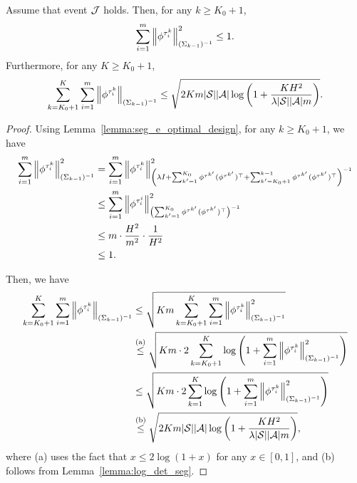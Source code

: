 \begin{lemma}\label{lemma:ellip_potent_with_opt_init_seg}
	Assume that event $\mathcal{J}$ holds. 
	Then, for any $k \geq K_0+1$,
	\begin{align*}
		\sum_{i=1}^{m} \left\|  \phi^{\tau^k_i} \right\|_{(\Sigma_{k-1})^{-1}}^2 \leq 1 .
	\end{align*}
	Furthermore, for any $K\geq K_0+1$,
	\begin{align*}
		\sum_{k=K_0+1}^{K} \sum_{i=1}^{m} \left\|  \phi^{\tau^k_i} \right\|_{(\Sigma_{k-1})^{-1}} \leq \sqrt{2Km |\mathcal{S}| |\mathcal{A}| \log \left(  1+ \frac{  KH^2 }{ \lambda |\mathcal{S}| |\mathcal{A}|m }  \right)} .
	\end{align*}
\end{lemma}
\begin{proof}
	Using Lemma~\ref{lemma:seg_e_optimal_design}, for any $k\geq K_0+1$, we have
	\begin{align*}
		\sum_{i=1}^{m} \left\|  \phi^{\tau^k_i} \right\|_{(\Sigma_{k-1})^{-1}}^2 &= \sum_{i=1}^{m} \left\|  \phi^{\tau^k_i} \right\|_{\left( \lambda I + \sum_{k'=1}^{K_0} \phi^{\tau^{k'}} (\phi^{\tau^{k'}})^\top + \sum_{k'=K_0+1}^{k-1} \phi^{\tau^{k'}} (\phi^{\tau^{k'}})^\top  \right)^{-1}}^2
		\\
		&\leq \sum_{i=1}^{m} \left\|  \phi^{\tau^i_i}  \right\|_{\left(  \sum_{k'=1}^{K_0} \phi^{\tau^{k'}} (\phi^{\tau^{k'}})^\top  \right)^{-1}}^2
		\\
		&\leq m \cdot \frac{H^2}{m^2} \cdot \frac{1}{H^2}
		\\
		&\leq 1 .
	\end{align*}
	
	Then, we have
	\begin{align*}
		\sum_{k=K_0+1}^{K} \sum_{i=1}^{m} \left\|  \phi^{\tau^k_i} \right\|_{(\Sigma_{k-1})^{-1}} &\leq \sqrt{ K m \sum_{k=K_0+1}^{K} \sum_{i=1}^{m} \left\|  \phi^{\tau^k_i} \right\|_{(\Sigma_{k-1})^{-1}}^2 }
		\\
		&\overset{\textup{(a)}}{\leq} \sqrt{ K m \cdot 2 \sum_{k=K_0+1}^{K} \log \left(  1 +  \sum_{i=1}^{m} \left\|  \phi^{\tau^k_i} \right\|_{(\Sigma_{k-1})^{-1}}^2  \right) }
		\\
		&\leq \sqrt{ K m \cdot 2 \sum_{k=1}^{K} \log \left(  1 +  \sum_{i=1}^{m} \left\|  \phi^{\tau^k_i} \right\|_{(\Sigma_{k-1})^{-1}}^2  \right) }
		\\
		&\overset{\textup{(b)}}{\leq} \sqrt{2K m |\mathcal{S}| |\mathcal{A}| \log \left(  1+ \frac{ KH^2 }{ \lambda |\mathcal{S}| |\mathcal{A}|m }  \right)} ,
	\end{align*}
	where (a) uses the fact that $x \leq 2\log(1+x)$ for any $x \in [0,1]$, and (b) follows from Lemma~\ref{lemma:log_det_seg}.
\end{proof}


